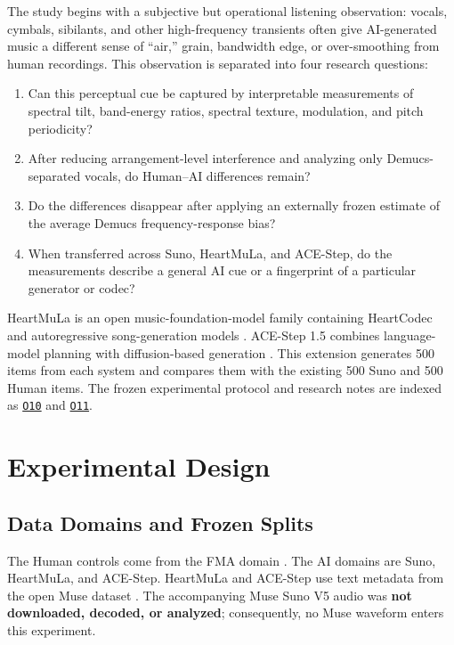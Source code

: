 \documentclass[11pt,a4paper]{article}
\newcommand{\outref}[1]{\hyperlink{output:#1}{\texttt{#1}}}
\begin{document}
The study begins with a subjective but operational listening observation: vocals, cymbals, sibilants, and other high-frequency transients often give AI-generated music a different sense of ``air,'' grain, bandwidth edge, or over-smoothing from human recordings. This observation is separated into four research questions:

\begin{enumerate}
  \item Can this perceptual cue be captured by interpretable measurements of spectral tilt, band-energy ratios, spectral texture, modulation, and pitch periodicity?
  \item After reducing arrangement-level interference and analyzing only Demucs-separated vocals, do Human--AI differences remain?
  \item Do the differences disappear after applying an externally frozen estimate of the average Demucs frequency-response bias?
  \item When transferred across Suno, HeartMuLa, and ACE-Step, do the measurements describe a general AI cue or a fingerprint of a particular generator or codec?
\end{enumerate}

HeartMuLa is an open music-foundation-model family containing HeartCodec and autoregressive song-generation models \citep{heartmula2026,heartlib2026}. ACE-Step 1.5 combines language-model planning with diffusion-based generation \citep{acestep2026,acestepcode2026}. This extension generates 500 items from each system and compares them with the existing 500 Suno and 500 Human items. The frozen experimental protocol and research notes are indexed as \outref{O10} and \outref{O11}.

\section{Experimental Design}
\label{sec:design}

\subsection{Data Domains and Frozen Splits}

The Human controls come from the FMA domain \citep{fma2017}. The AI domains are Suno, HeartMuLa, and ACE-Step. HeartMuLa and ACE-Step use text metadata from the open Muse dataset \citep{muse2026,musedataset2026}. The accompanying Muse Suno V5 audio was \textbf{not downloaded, decoded, or analyzed}; consequently, no Muse waveform enters this experiment.
\end{document}
